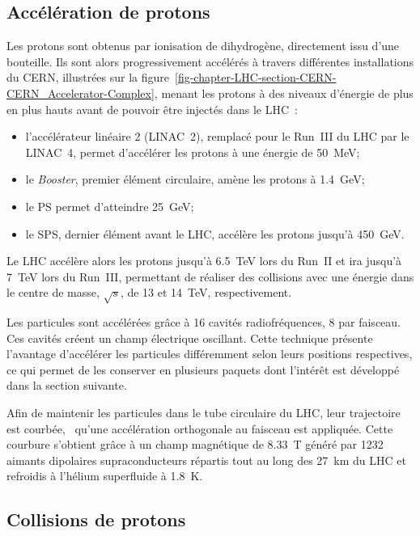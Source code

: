 \subsection{Accélération de protons}\label{chapter-LHC-section-LHC-subsec-pp_acceleration}
Les protons sont obtenus par ionisation de dihydrogène, directement issu d'une bouteille.
Ils sont alors progressivement accélérés à travers différentes installations du CERN, illustrées sur la figure~\ref{fig-chapter-LHC-section-CERN-CERN_Accelerator-Complex}, menant les protons à des niveaux d'énergie de plus en plus hauts avant de pouvoir être injectés dans le LHC~\cite{LHC_paper3}:
\begin{itemize}
\item l'accélérateur linéaire 2 (LINAC~2), remplacé pour le Run~III du LHC par le LINAC~4, permet d'accélérer les protons à une énergie de \SI{50}{\MeV};
\item le \emph{Booster}, premier élément circulaire, amène les protons à \SI{1.4}{\GeV};
\item le PS permet d'atteindre \SI{25}{\GeV};
\item le SPS, dernier élément avant le LHC, accélère les protons jusqu'à \SI{450}{\GeV}.
\end{itemize}
Le LHC accélère alors les protons jusqu'à \SI{6.5}{\TeV} lors du Run~II et ira jusqu'à \SI{7}{\TeV} lors du Run~III, permettant de réaliser des collisions avec une énergie dans le centre de masse, $\sqrt{s}$, de \num{13} et \SI{14}{\TeV}, respectivement.
\par Les particules sont accélérées grâce à 16 cavités radiofréquences, 8 par faisceau.
Ces cavités créent un champ électrique oscillant.
Cette technique présente l'avantage d'accélérer les particules différemment selon leurs positions respectives, ce qui permet de les conserver en plusieurs paquets dont l'intérêt est développé dans la section suivante.
\par Afin de maintenir les particules dans le tube circulaire du LHC, leur trajectoire est courbée, \ie\ qu'une accélération orthogonale au faisceau est appliquée.
Cette courbure s'obtient grâce à un champ magnétique de \SI{8.33}{\tesla} généré par 1232 aimants dipolaires supraconducteurs répartis tout au long des \SI{27}{\kilo\meter} du LHC et refroidis à l'hélium superfluide à \SI{1.8}{\kelvin}.
\subsection{Collisions de protons}\label{chapter-LHC-section-LHC-subsec-pp_collisions}
